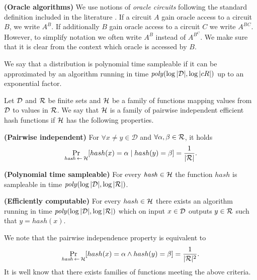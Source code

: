 \textbf{(Oracle algorithms)}
We use notions of \textit{oracle circuits} following the standard definition included in the literature \cite{Goldreich:2004:FCV:975541}.
If a circuit $A$ gain oracle access to a circuit $B$, we write $A^{B}$. If additionally $B$ gain oracle access to a circuit $C$
we write $A^{B^{}C}$. However, to simplify notation we often write $A^{B}$ instead of $A^{B^C}$.
We make sure that it is clear from the context which oracle is accessed by $B$.

\begin{definition}
We say that a distribution is \textnormal{polynomial time sampleable} if it can be approximated by an algorithm running in time $\mathit{poly}(\log|\mathcal{D}|, \log|cR|)$
up to an exponential factor.
\end{definition}

\begin{definition}
Let $\mathcal{D}$ and $\mathcal{R}$ be finite sets and $\mathcal{H}$ be a family of functions mapping values from $\mathcal{D}$ to values in $\mathcal{R}$.
We say that $\mathcal{H}$ is a \textnormal{family of pairwise independent efficient hash functions}
if $\mathcal{H}$ has the following properties.

\textbf{(Pairwise independent)} For $\forall x \neq y \in \mathcal{D}$ and $\forall \alpha, \beta \in \mathcal{R}$, it holds
\begin{displaymath}
\underset{\hash \la0 \cH}{\Pr}[hash(x) = \alpha \mid hash(y) = \beta] = \frac{1}{|\cR|}.
\end{displaymath}

\textbf{(Polynomial time sampleable)} For every $\mathit{hash} \in \mathcal{H}$ the function $\mathit{hash}$ is sampleable in time $\mathit{poly}(\log|\mathcal{D}|, \log|\mathcal{R}|)$.

\textbf{(Efficiently computable)}
For every $hash \in \mathcal{H}$ there exists an algorithm running in time $\mathit{poly}(\log|\mathcal{D}|, \log|\mathcal{R}|)$ which
on input $x \in \mathcal{D}$ outputs $y \in \mathcal{R}$ such that $y = hash(x)$.
\end{definition}

We note that the pairwise independence property is equivalent to
\begin{displaymath}
\underset{\hash \la0 \cH}{\Pr}[hash(x) = \alpha \land hash(y) = \beta] = \frac{1}{|\cR|^2}.
\end{displaymath}
It is well know \cite{Carter:1977:UCH:800105.803400} that there exists families of functions meeting the above criteria.

